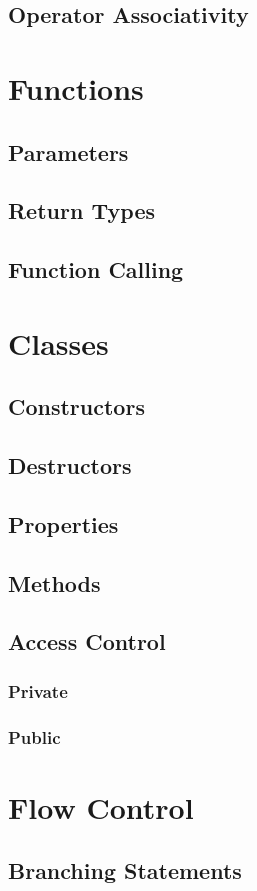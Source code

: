 \documentclass{book}
\begin{document}
\subsection{Operator Associativity}
\section{Functions}
\subsection{Parameters}
\subsection{Return Types}
\subsection{Function Calling}
\section{Classes}
\subsection{Constructors}
\subsection{Destructors}
\subsection{Properties}
\subsection{Methods}
\subsection{Access Control}
\subsubsection{Private}
\subsubsection{Public}
\section{Flow Control}
\subsection{Branching Statements}
\end{document}
